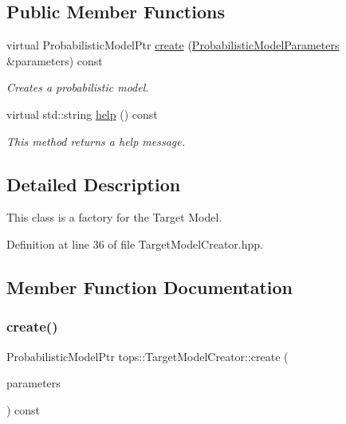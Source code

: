 \subsection*{Public Member Functions}
\begin{DoxyCompactItemize}
\item 
virtual Probabilistic\+Model\+Ptr \hyperlink{classtops_1_1TargetModelCreator_ac50e4d0f68f47511d4c5b9683cba11b4}{create} (\hyperlink{classtops_1_1ProbabilisticModelParameters}{Probabilistic\+Model\+Parameters} \&parameters) const
\begin{DoxyCompactList}\small\item\em Creates a probabilistic model. \end{DoxyCompactList}\item 
\mbox{\label{classtops_1_1TargetModelCreator_acb73685f7ad2619fa7faeb6709179f15}} 
virtual std\+::string \hyperlink{classtops_1_1TargetModelCreator_acb73685f7ad2619fa7faeb6709179f15}{help} () const
\begin{DoxyCompactList}\small\item\em This method returns a help message. \end{DoxyCompactList}\end{DoxyCompactItemize}


\subsection{Detailed Description}
This class is a factory for the Target Model. 

Definition at line 36 of file Target\+Model\+Creator.\+hpp.



\subsection{Member Function Documentation}
\mbox{\label{classtops_1_1TargetModelCreator_ac50e4d0f68f47511d4c5b9683cba11b4}} 
\subsubsection{\texorpdfstring{create()}{create()}}
{\footnotesize\ttfamily Probabilistic\+Model\+Ptr tops\+::\+Target\+Model\+Creator\+::create (\begin{DoxyParamCaption}\item[{\hyperlink{classtops_1_1ProbabilisticModelParameters}{Probabilistic\+Model\+Parameters} \&}]{parameters }\end{DoxyParamCaption}) const\hspace{0.3cm}{\ttfamily [virtual]}}



